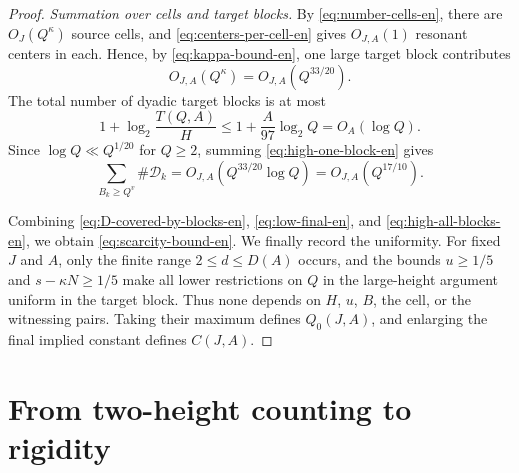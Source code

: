 \documentclass[11pt]{amsart}
\numberwithin{equation}{section}
\theoremstyle{definition}
\theoremstyle{remark}
\newtheorem{remark}[remark]{Remark}
\begin{document}
\begin{proof}
\emph{Summation over cells and target blocks.} By \eqref{eq:number-cells-en}, there are $O_J(Q^\kappa)$ source
cells, and \eqref{eq:centers-per-cell-en} gives $O_{J,A}(1)$ resonant
centers in each. Hence, by \eqref{eq:kappa-bound-en}, one large target
block contributes
\begin{equation}\label{eq:high-one-block-en}
O_{J,A}(Q^\kappa)=O_{J,A}(Q^{33/20}).
\end{equation}
The total number of dyadic target blocks is at most
\[
1+\log_2\frac{T(Q,A)}{H}
\leq
1+\frac{A}{97}\log_2Q
=O_A(\log Q).
\]
Since $\log Q\ll Q^{1/20}$ for $Q\geq2$, summing
\eqref{eq:high-one-block-en} gives
\begin{equation}\label{eq:high-all-blocks-en}
\sum_{B_k\geq Q^v}\#\mathcal D_k
=O_{J,A}(Q^{33/20}\log Q)
=O_{J,A}(Q^{17/10}).
\end{equation}

Combining \eqref{eq:D-covered-by-blocks-en},
\eqref{eq:low-final-en}, and \eqref{eq:high-all-blocks-en}, we obtain
\eqref{eq:scarcity-bound-en}. We finally record the uniformity. For
fixed $J$ and $A$, only the finite range $2\leq d\leq D(A)$ occurs,
and the bounds $u\geq1/5$ and $s-\kappa N\geq1/5$ make all lower
restrictions on $Q$ in the large-height argument uniform in the target
block. Thus none depends on $H$, $u$, $B$, the cell, or the witnessing
pairs. Taking their maximum defines $Q_0(J,A)$, and enlarging the final
implied constant defines $C(J,A)$.
\end{proof}


\section{From two-height counting to rigidity}
\label{sec:fusion}
\end{document}
